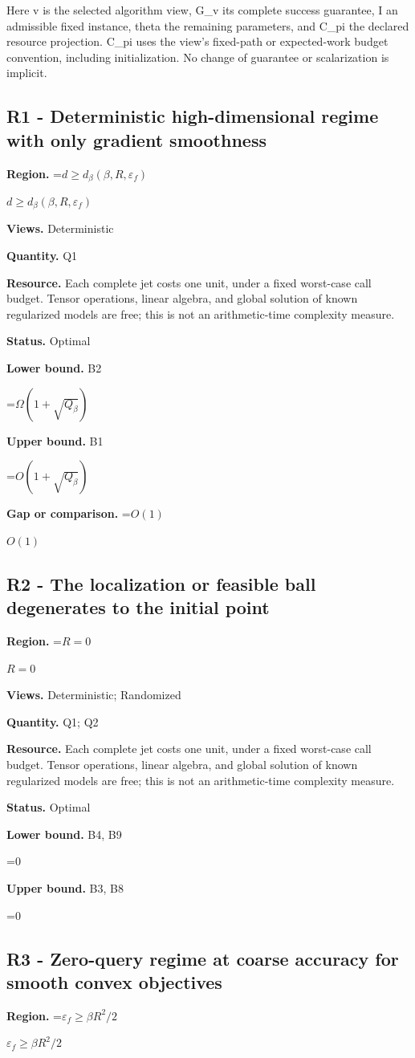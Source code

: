 \documentclass[10pt,a4paper]{article}
\newcommand{\AtlasMath}[1]{\par\begingroup\centering\setbox0=\hbox{$\displaystyle #1$}\ifdim\wd0>1.4\linewidth\typeout{ATLAS WIDE FORMULA: \the\wd0}\fi\ifdim\wd0>\linewidth\resizebox{\linewidth}{!}{\box0}\else\box0\fi\par\endgroup}
\newcommand{\AtlasInlineMath}[1]{\begingroup\setbox0=\hbox{$#1$}\ifdim\wd0>.4\linewidth\endgroup\AtlasMath{#1}\else\endgroup$#1$\fi}
\begin{document}
Here v is the selected algorithm view, G\_v its complete success guarantee, I an admissible fixed instance, theta the remaining parameters, and C\_pi the declared resource projection. C\_pi uses the view's fixed-path or expected-work budget convention, including initialization. No change of guarantee or scalarization is implicit.

\subsection{R1 - Deterministic high-dimensional regime with only gradient smoothness}
\textbf{Region.} \AtlasInlineMath{d\ge d_{\beta}(\beta,R,\varepsilon_f)}

\textbf{Views.} Deterministic

\textbf{Quantity.} Q1

\textbf{Resource.} Each complete jet costs one unit, under a fixed worst-case call budget. Tensor operations, linear algebra, and global solution of known regularized models are free; this is not an arithmetic-time complexity measure.

\textbf{Status.} Optimal

\textbf{Lower bound.} B2

\AtlasMath{\Omega(1+\sqrt{Q_\beta})}
\textbf{Upper bound.} B1

\AtlasMath{O(1+\sqrt{Q_\beta})}
\textbf{Gap or comparison.} \AtlasInlineMath{O(1)}

\subsection{R2 - The localization or feasible ball degenerates to the initial point}
\textbf{Region.} \AtlasInlineMath{R=0}

\textbf{Views.} Deterministic; Randomized

\textbf{Quantity.} Q1; Q2

\textbf{Resource.} Each complete jet costs one unit, under a fixed worst-case call budget. Tensor operations, linear algebra, and global solution of known regularized models are free; this is not an arithmetic-time complexity measure.

\textbf{Status.} Optimal

\textbf{Lower bound.} B4, B9

\AtlasMath{0}
\textbf{Upper bound.} B3, B8

\AtlasMath{0}
\subsection{R3 - Zero-query regime at coarse accuracy for smooth convex objectives}
\textbf{Region.} \AtlasInlineMath{\varepsilon_f\ge\beta R^2/2}
\end{document}
